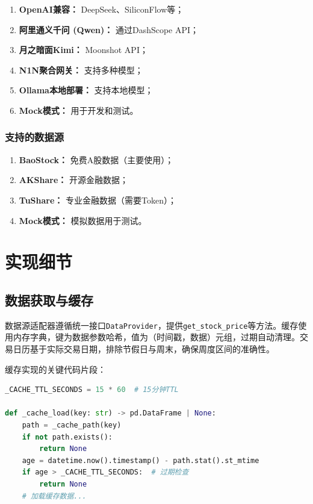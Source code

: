 \documentclass[12pt,a4paper]{ctexart}
\begin{document}
\begin{enumerate}
    \item \textbf{OpenAI兼容：} DeepSeek、SiliconFlow等；
    \item \textbf{阿里通义千问 (Qwen)：} 通过DashScope API；
    \item \textbf{月之暗面Kimi：} Moonshot API；
    \item \textbf{N1N聚合网关：} 支持多种模型；
    \item \textbf{Ollama本地部署：} 支持本地模型；
    \item \textbf{Mock模式：} 用于开发和测试。
\end{enumerate}

\subsubsection{支持的数据源}

\begin{enumerate}
    \item \textbf{BaoStock：} 免费A股数据（主要使用）；
    \item \textbf{AKShare：} 开源金融数据；
    \item \textbf{TuShare：} 专业金融数据（需要Token）；
    \item \textbf{Mock模式：} 模拟数据用于测试。
\end{enumerate}

\section{实现细节}

\subsection{数据获取与缓存}

数据源适配器遵循统一接口\texttt{DataProvider}，提供\texttt{get\_stock\_price}等方法。缓存使用内存字典，键为数据参数哈希，值为（时间戳，数据）元组，过期自动清理。交易日历基于实际交易日期，排除节假日与周末，确保周度区间的准确性。

缓存实现的关键代码片段：

\begin{lstlisting}[language=Python, caption=缓存机制实现]
_CACHE_TTL_SECONDS = 15 * 60  # 15分钟TTL

def _cache_load(key: str) -> pd.DataFrame | None:
    path = _cache_path(key)
    if not path.exists():
        return None
    age = datetime.now().timestamp() - path.stat().st_mtime
    if age > _CACHE_TTL_SECONDS:  # 过期检查
        return None
    # 加载缓存数据...
\end{lstlisting}
\end{document}
